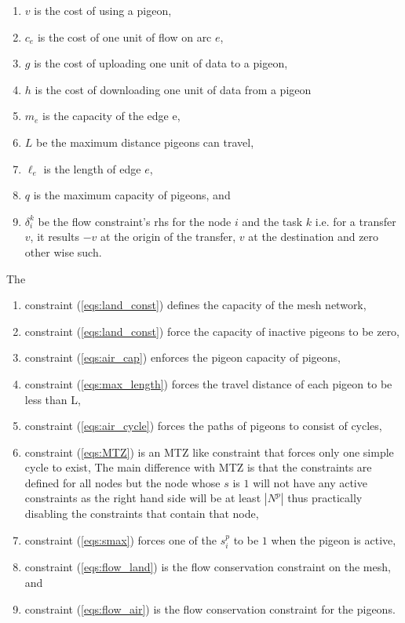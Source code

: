 \documentclass{article}
\begin{document}
	\begin{enumerate}
	\item $v$ is the cost of using a pigeon,
	\item $c_e$ is the cost of one unit of flow on arc $e$,
	\item $g$ is the cost of uploading one unit of data to a pigeon,
	\item $h$ is the cost of downloading one unit of data from a pigeon
	\item $m_e$ is the capacity of the edge e,  
	
	\item $L$ be the maximum distance pigeons can travel,
	\item $\ell_e$ is the length of edge $e$,
	\item $q$ is the maximum capacity of pigeons, and
	\item $\delta^k_{i}$ be the flow constraint's rhs for the node $i$ and the task $k$ i.e. for a transfer $v$, it results $-v$ at the origin of the transfer, $v$ at the destination and zero other wise such.
	\end{enumerate}
	The  
	\begin{enumerate}
		\item constraint (\ref{eqs:land_const}) defines the capacity of the mesh network, 
		\item constraint (\ref{eqs:land_const}) force the capacity of inactive pigeons to be zero,
		\item constraint (\ref{eqs:air_cap}) enforces the pigeon capacity of pigeons,
		\item constraint (\ref{eqs:max_length}) forces the travel distance of each pigeon to be less than L,
		\item constraint (\ref{eqs:air_cycle}) forces the paths of pigeons to consist of cycles,
		\item constraint (\ref{eqs:MTZ}) is an MTZ like constraint that forces only one simple cycle to exist, The main difference with MTZ is that the constraints are defined for all nodes but the node whose $s$ is $1$ will not have any active constraints as the right hand side will be at least $|N^p|$ thus practically disabling the constraints that contain that node,
		\item constraint (\ref{eqs:smax}) forces one of the $s^p_i$ to be $1$ when the pigeon is active,
		\item constraint (\ref{eqs:flow_land}) is the flow conservation constraint on the mesh, and 
		\item constraint (\ref{eqs:flow_air}) is the flow conservation constraint for the pigeons.
	\end{enumerate}
\end{document}
